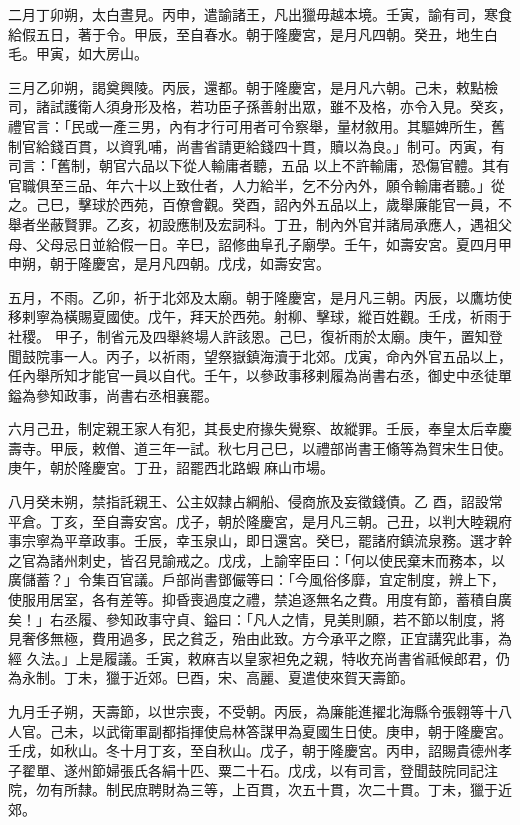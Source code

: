 \begin{pinyinscope}
 二月丁卯朔，太白晝見。丙申，遣諭諸王，凡出獵毋越本境。壬寅，諭有司，寒食給假五日，著于令。甲辰，至自春水。朝于隆慶宮，是月凡四朝。癸丑，地生白毛。甲寅，如大房山。



 三月乙卯朔，謁奠興陵。丙辰，還都。朝于隆慶宮，是月凡六朝。己未，敕點檢司，諸試護衛人須身形及格，若功臣子孫善射出眾，雖不及格，亦令入見。癸亥，禮官言：「民或一產三男，內有才行可用者可令察舉，量材敘用。其驅婢所生，舊制官給錢百貫，以資乳哺，尚書省請更給錢四十貫，贖以為良。」制可。丙寅，有司言：「舊制，朝官六品以下從人輸庸者聽，五品
 以上不許輸庸，恐傷官體。其有官職俱至三品、年六十以上致仕者，人力給半，乞不分內外，願令輸庸者聽。」從之。己巳，擊球於西苑，百僚會觀。癸酉，詔內外五品以上，歲舉廉能官一員，不舉者坐蔽賢罪。乙亥，初設應制及宏詞科。丁丑，制內外官并諸局承應人，遇祖父母、父母忌日並給假一日。辛巳，詔修曲阜孔子廟學。壬午，如壽安宮。夏四月甲申朔，朝于隆慶宮，是月凡四朝。戊戌，如壽安宮。



 五月，不雨。乙卯，祈于北郊及太廟。朝于隆慶宮，是月凡三朝。丙辰，以鷹坊使移剌寧為橫賜夏國使。戊午，拜天於西苑。射柳、擊球，縱百姓觀。壬戌，祈雨于社稷。
 甲子，制省元及四舉終場人許該恩。己巳，復祈雨於太廟。庚午，置知登聞鼓院事一人。丙子，以祈雨，望祭嶽鎮海瀆于北郊。戊寅，命內外官五品以上，任內舉所知才能官一員以自代。壬午，以參政事移剌履為尚書右丞，御史中丞徒單鎰為參知政事，尚書右丞相襄罷。



 六月己丑，制定親王家人有犯，其長史府掾失覺察、故縱罪。壬辰，奉皇太后幸慶壽寺。甲辰，敕僧、道三年一試。秋七月己巳，以禮部尚書王翛等為賀宋生日使。庚午，朝於隆慶宮。丁丑，詔罷西北路蝦麻山市場。



 八月癸未朔，禁指託親王、公主奴隸占綱船、侵商旅及妄徵錢債。乙
 酉，詔設常平倉。丁亥，至自壽安宮。戊子，朝於隆慶宮，是月凡三朝。己丑，以判大睦親府事宗寧為平章政事。壬辰，幸玉泉山，即日還宮。癸巳，罷諸府鎮流泉務。選才幹之官為諸州刺史，皆召見諭戒之。戊戌，上諭宰臣曰：「何以使民棄末而務本，以廣儲蓄？」令集百官議。戶部尚書鄧儼等曰：「今風俗侈靡，宜定制度，辨上下，使服用居室，各有差等。抑昏喪過度之禮，禁追逐無名之費。用度有節，蓄積自廣矣！」右丞履、參知政事守貞、鎰曰：「凡人之情，見美則願，若不節以制度，將見奢侈無極，費用過多，民之貧乏，殆由此致。方今承平之際，正宜講究此事，為經
 久法。」上是履議。壬寅，敕麻吉以皇家袒免之親，特收充尚書省祗候郎君，仍為永制。丁未，獵于近郊。巳酉，宋、高麗、夏遣使來賀天壽節。



 九月壬子朔，天壽節，以世宗喪，不受朝。丙辰，為廉能進擢北海縣令張翱等十八人官。己未，以武衛軍副都指揮使烏林答謀甲為夏國生日使。庚申，朝于隆慶宮。壬戌，如秋山。冬十月丁亥，至自秋山。戊子，朝于隆慶宮。丙申，詔賜貴德州孝子翟單、遂州節婦張氏各絹十匹、粟二十石。戊戌，以有司言，登聞鼓院同記注院，勿有所隸。制民庶聘財為三等，上百貫，次五十貫，次二十貫。丁未，獵于近郊。




\end{pinyinscope}
